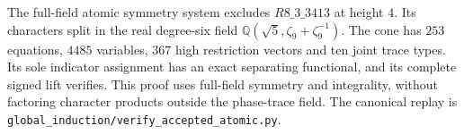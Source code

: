 The full-field atomic symmetry system excludes $R8\_3\_3413$ at
height $4$. Its characters split in the real degree-six field
$\mathbb Q(\sqrt5,\zeta_9+\zeta_9^{-1})$. The cone has $253$ equations,
$4485$ variables, $367$ high restriction vectors and ten joint trace
types. Its sole indicator assignment has an exact separating
functional, and its complete signed lift verifies. This proof uses
full-field symmetry and integrality, without factoring character
products outside the phase-trace field. The canonical replay is
\texttt{global\_induction/verify\_accepted\_atomic.py}.
